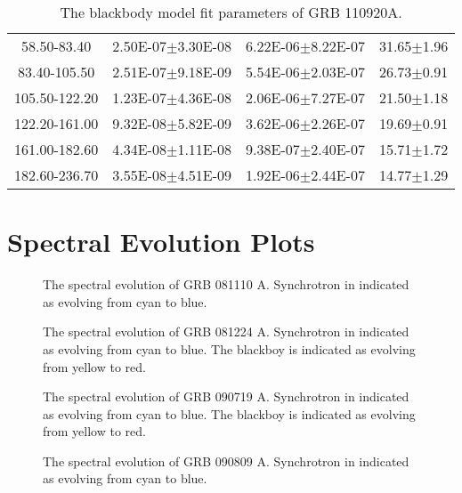\begin{table}[h]
\begin{tabular}{c| c c c}
58.50-83.40 & 2.50E-07$\pm$3.30E-08 & 6.22E-06$\pm$8.22E-07 & 31.65$\pm$1.96 \\ 

83.40-105.50 & 2.51E-07$\pm$9.18E-09 & 5.54E-06$\pm$2.03E-07 & 26.73$\pm$0.91 \\ 

105.50-122.20 & 1.23E-07$\pm$4.36E-08 & 2.06E-06$\pm$7.27E-07 & 21.50$\pm$1.18 \\ 

122.20-161.00 & 9.32E-08$\pm$5.82E-09 & 3.62E-06$\pm$2.26E-07 & 19.69$\pm$0.91 \\ 

161.00-182.60 & 4.34E-08$\pm$1.11E-08 & 9.38E-07$\pm$2.40E-07 & 15.71$\pm$1.72 \\ 

182.60-236.70 & 3.55E-08$\pm$4.51E-09 & 1.92E-06$\pm$2.44E-07 & 14.77$\pm$1.29 \\ 

\end{tabular}
\caption{The blackbody model fit parameters of GRB 110920A.}
\end{table}


\section{Spectral Evolution Plots}

\begin{figure}[h]
  \centering
  \caption{The spectral evolution of GRB 081110 A. Synchrotron in
    indicated as evolving from cyan to blue.}
  \label{fig:specEvoGRB1}
\end{figure}

\begin{figure}[h]
  \centering
  \caption{The spectral evolution of GRB 081224 A. Synchrotron in
    indicated as evolving from cyan to blue. The blackboy is indicated
    as evolving from yellow to red.}
  \label{fig:specEvoGRB2}
\end{figure}

\begin{figure}[h]
  \centering
  \caption{The spectral evolution of GRB 090719 A. Synchrotron in
    indicated as evolving from cyan to blue. The blackboy is indicated
    as evolving from yellow to red.}
  \label{fig:specEvoGRB3}
\end{figure}

\begin{figure}[h]
  \centering
  \caption{The spectral evolution of GRB 090809 A. Synchrotron in
    indicated as evolving from cyan to blue.}
  \label{fig:specEvoGRB4}
\end{figure}

